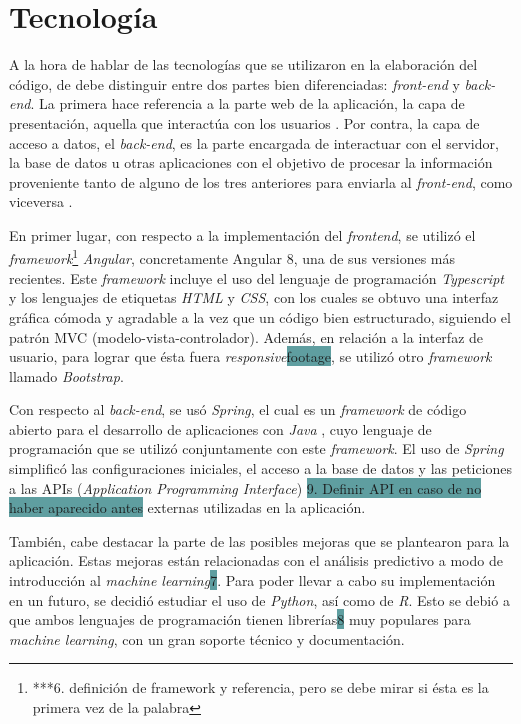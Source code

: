 \documentclass[pdftex,11pt,a4paper]{book}
\begin{document}
\section{Tecnología}

A la hora de hablar de las tecnologías que se utilizaron en la elaboración del código, de debe distinguir entre dos partes bien diferenciadas: \textit{front-end} y \textit{back-end}. La primera hace referencia a la parte web de la aplicación, la capa de presentación, aquella que interactúa con los usuarios \cite{bib:front-end}. Por contra, la capa de acceso a datos, el \textit{back-end}, es la parte encargada de interactuar con el servidor, la base de datos u otras aplicaciones con el objetivo de procesar la información proveniente tanto de alguno de los tres anteriores para enviarla al \textit{front-end}, como viceversa \cite{bib:frontendybackend}.

En primer lugar, con respecto a la implementación del \textit{frontend}, se utilizó el \textit{framework}\footnote{\colorbox{MiColor}{ ***6. definición de framework y referencia, pero se debe mirar si ésta es la primera vez de la palabra} } \textit{Angular}, concretamente Angular 8, una de sus versiones más recientes. Este \textit{framework} incluye el uso del lenguaje de programación \textit{Typescript} y los lenguajes de etiquetas \textit{HTML} y \textit{CSS}, con los cuales se obtuvo una interfaz gráfica cómoda y agradable a la vez que un código bien estructurado, siguiendo el patrón MVC (modelo-vista-controlador). Además, en relación a la interfaz de usuario, para lograr que ésta fuera \textit{responsive}\colorbox{CadetBlue}{footage}, se utilizó otro \textit{framework} llamado \textit{Bootstrap}.

Con respecto al \textit{back-end}, se usó \textit{Spring}, el cual es un \textit{framework} de código abierto para el desarrollo de aplicaciones con \textit{Java} \cite{bib:spring}, cuyo lenguaje de programación que se utilizó conjuntamente con este \textit{framework}. El uso de \textit{Spring} simplificó las configuraciones iniciales, el acceso a la base de datos y las peticiones a las APIs (\textit{Application Programming Interface}) \colorbox{CadetBlue}{9. Definir API en caso de no haber aparecido antes} externas utilizadas en la aplicación.  

También, cabe destacar la parte de las posibles mejoras que se plantearon para la aplicación. Estas mejoras están relacionadas con el análisis predictivo a modo de introducción al \textit{machine learning}\colorbox{CadetBlue}{7}. Para poder llevar a cabo su implementación en un futuro, se decidió estudiar el uso de \textit{Python}, así como de \textit{R}. Esto se debió a que ambos lenguajes de programación tienen librerías\colorbox{CadetBlue}{8} muy populares para \textit{machine learning}, con un gran soporte técnico y documentación.
\end{document}
